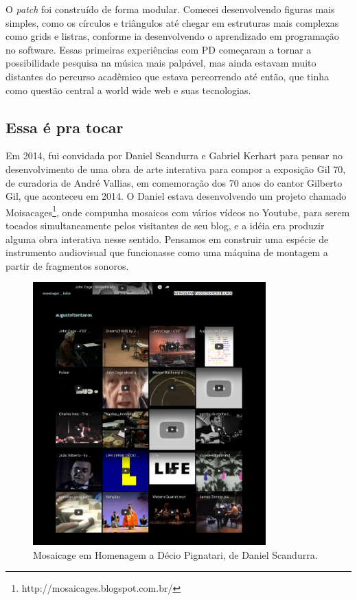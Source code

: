 O \emph{patch} foi construído de forma modular. Comecei desenvolvendo figuras mais simples, como os círculos e triângulos até chegar em estruturas mais complexas como grids e listras, conforme ia desenvolvendo o aprendizado em programação no software. Essas primeiras experiências com PD começaram a tornar a possibilidade pesquisa na música mais palpável, mas ainda estavam muito distantes do percurso acadêmico que estava percorrendo até então, que tinha como questão central a world wide web e suas tecnologias.

\subsection{Essa é pra tocar}
Em 2014, fui convidada por Daniel Scandurra e Gabriel Kerhart para pensar no desenvolvimento de uma obra de arte interativa para compor a exposição Gil 70, de curadoria de André Vallias, em comemoração dos 70 anos do cantor Gilberto Gil, que aconteceu em 2014. O Daniel estava desenvolvendo um projeto chamado Moisacages\footnote{http://mosaicages.blogspot.com.br/}, onde compunha mosaicos com vários vídeos no Youtube, para serem tocados simultaneamente pelos visitantes de seu blog, e a idéia era produzir alguma obra interativa nesse sentido. Pensamos em construir uma espécie de instrumento audiovisual que funcionasse como uma máquina de montagem a partir de fragmentos sonoros.

\begin{figure}

\includegraphics[width=0.8\textwidth]{pictures/cap1/mosaicages}
\caption{Mosaicage em Homenagem a Décio Pignatari, de Daniel Scandurra.}
\label{fig:hp}
\end{figure}

